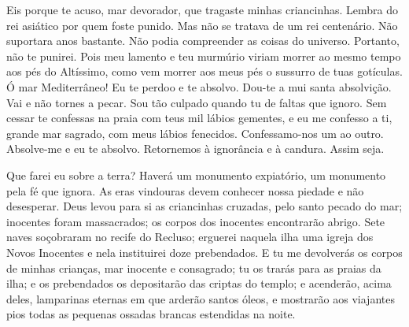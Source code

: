 Eis porque te acuso, mar devorador, que tragaste minhas criancinhas. Lembra
do rei asiático por quem foste punido. Mas não se tratava de um rei
centenário. Não suportara anos bastante. Não podia compreender as coisas
do universo. Portanto, não te punirei. Pois meu lamento e teu murmúrio
viriam morrer ao mesmo tempo aos pés do Altíssimo, como vem morrer aos
meus pés o sussurro de tuas gotículas. Ó mar Mediterrâneo! Eu te perdoo e
te absolvo. Dou-te a mui santa absolvição. Vai e não tornes a pecar. Sou
tão culpado quando tu de faltas que ignoro. Sem cessar te confessas na
praia com teus mil lábios gementes, e eu me confesso a ti, grande mar
sagrado, com meus lábios fenecidos. Confessamo-nos um ao outro. Absolve-me
e eu te absolvo. Retornemos à ignorância e à candura. Assim seja.

Que farei eu sobre a terra? Haverá um monumento expiatório, um monumento
pela fé que ignora. As eras vindouras devem conhecer nossa piedade e não
desesperar. Deus levou para si as criancinhas cruzadas, pelo santo pecado
do mar; inocentes foram massacrados; os corpos dos inocentes encontrarão
abrigo. Sete naves soçobraram no recife do Recluso; erguerei naquela ilha
uma igreja dos Novos Inocentes e nela instituirei doze prebendados. E tu
me devolverás os corpos de minhas crianças, mar inocente e consagrado; tu
os trarás para as praias da ilha; e os prebendados os depositarão das
criptas do templo; e acenderão, acima deles, lamparinas eternas em que
arderão santos óleos, e mostrarão aos viajantes pios todas as pequenas
ossadas brancas estendidas na noite.


